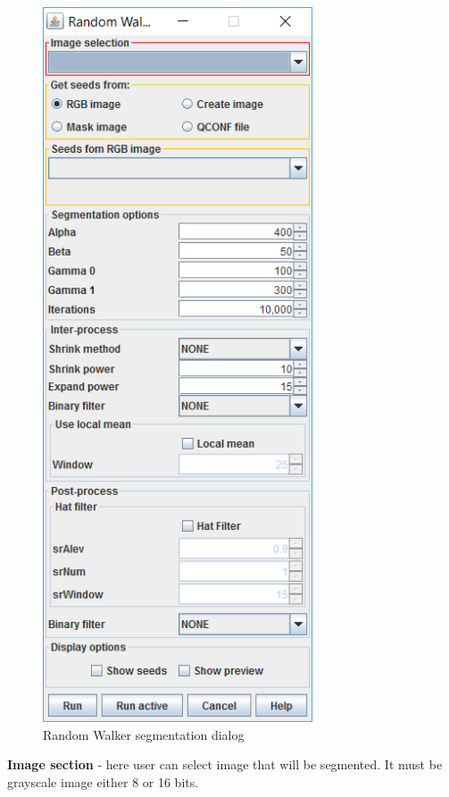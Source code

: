 \documentclass[a4paper,12pt]{article}
\begin{document}
\begin{figure}[ht]
	\centering
	\includegraphics[width=8cm]{screenRandomWalk.png} 
	\caption{Random Walker segmentation dialog}
	\label{fig:rwdialog}
\end{figure}

\textbf{Image section} - here user can select image that will be segmented. It must be grayscale image either 8 or 16 bits.
\end{document}
